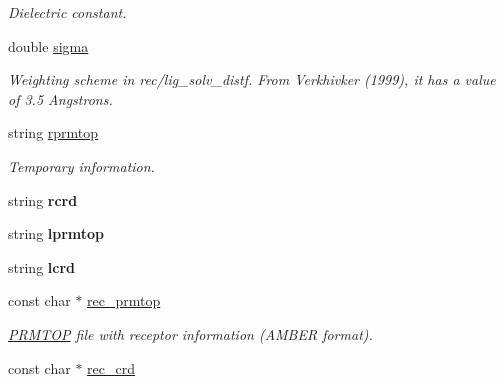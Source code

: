 \begin{DoxyCompactItemize}
\begin{DoxyCompactList}\small\item\em Dielectric constant. \item\end{DoxyCompactList}\item 
\hypertarget{classPARSER_a15f292abaad105d5e454867ae04e99bd}{
double \hyperlink{classPARSER_a15f292abaad105d5e454867ae04e99bd}{sigma}}
\label{classPARSER_a15f292abaad105d5e454867ae04e99bd}

\begin{DoxyCompactList}\small\item\em Weighting scheme in rec/lig\_\-solv\_\-distf. From Verkhivker (1999), it has a value of 3.5 Angstrons. \item\end{DoxyCompactList}\item 
\hypertarget{classPARSER_a566a91168730cb9fcfe242563a03f6b5}{
string \hyperlink{classPARSER_a566a91168730cb9fcfe242563a03f6b5}{rprmtop}}
\label{classPARSER_a566a91168730cb9fcfe242563a03f6b5}

\begin{DoxyCompactList}\small\item\em Temporary information. \item\end{DoxyCompactList}\item 
\hypertarget{classPARSER_a4780ee8b1f3c779c0d05be46192f874f}{
string {\bfseries rcrd}}
\label{classPARSER_a4780ee8b1f3c779c0d05be46192f874f}

\item 
\hypertarget{classPARSER_a6a287ab064d25899736201bac9e9082d}{
string {\bfseries lprmtop}}
\label{classPARSER_a6a287ab064d25899736201bac9e9082d}

\item 
\hypertarget{classPARSER_ae07d5337f3d0ec4250a4bc6adf0d8018}{
string {\bfseries lcrd}}
\label{classPARSER_ae07d5337f3d0ec4250a4bc6adf0d8018}

\item 
\hypertarget{classPARSER_ad9fc544191b296d607ce6b75e653a5e4}{
const char $\ast$ \hyperlink{classPARSER_ad9fc544191b296d607ce6b75e653a5e4}{rec\_\-prmtop}}
\label{classPARSER_ad9fc544191b296d607ce6b75e653a5e4}

\begin{DoxyCompactList}\small\item\em \hyperlink{classPRMTOP}{PRMTOP} file with receptor information (AMBER format). \item\end{DoxyCompactList}\item 
\hypertarget{classPARSER_a8edd98ab50c647cdfa1b68105de0ff88}{
const char $\ast$ \hyperlink{classPARSER_a8edd98ab50c647cdfa1b68105de0ff88}{rec\_\-crd}}
\label{classPARSER_a8edd98ab50c647cdfa1b68105de0ff88}


\end{DoxyCompactItemize}
